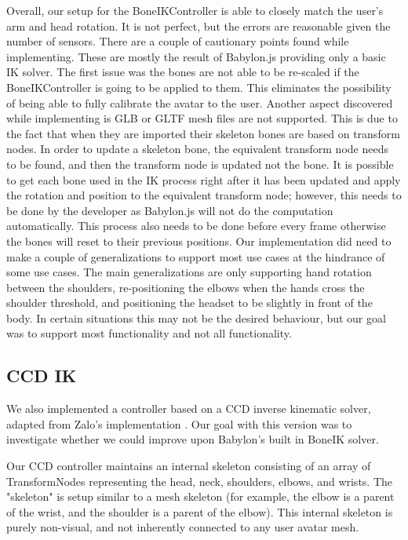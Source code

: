 \documentclass{vgtc}                          %
\begin{document}
Overall, our setup for the BoneIKController is able to closely match the user’s arm and head rotation. It is not perfect, but the errors are reasonable given the number of sensors. There are a couple of cautionary points found while implementing. These are mostly the result of Babylon.js providing only a basic IK solver. The first issue was the bones are not able to be re-scaled if the BoneIKController is going to be applied to them. This eliminates the possibility of being able to fully calibrate the avatar to the user. Another aspect discovered while implementing is GLB or GLTF mesh files are not supported. This is due to the fact that when they are imported their skeleton bones are based on transform nodes. In order to update a skeleton bone, the equivalent transform node needs to be found, and then the transform node is updated not the bone. It is possible to get each bone used in the IK process right after it has been updated and apply the rotation and position to the equivalent transform node; however, this needs to be done by the developer as Babylon.js will not do the computation automatically. This process also needs to be done before every frame otherwise the bones will reset to their previous positions. Our implementation did need to make a couple of generalizations to support most use cases at the hindrance of some use cases. The main generalizations are only supporting hand rotation between the shoulders, re-positioning the elbows when the hands cross the shoulder threshold, and positioning the headset to be slightly in front of the body.  In certain situations this may not be the desired behaviour, but our goal was to support most functionality and not all functionality. 

\subsection{CCD IK}

    We also implemented a controller based on a CCD inverse kinematic solver, adapted from Zalo's implementation \cite{Zalo}. Our goal with this version was to investigate whether we could improve upon Babylon's built in BoneIK solver. 

    Our CCD controller maintains an internal skeleton consisting of an array of TransformNodes representing the head, neck, shoulders, elbows, and wrists. The "skeleton" is setup similar to a mesh skeleton (for example, the elbow is a parent of the wrist, and the shoulder is a parent of the elbow). This internal skeleton is purely non-visual, and not inherently connected  to any user avatar mesh.
\end{document}
